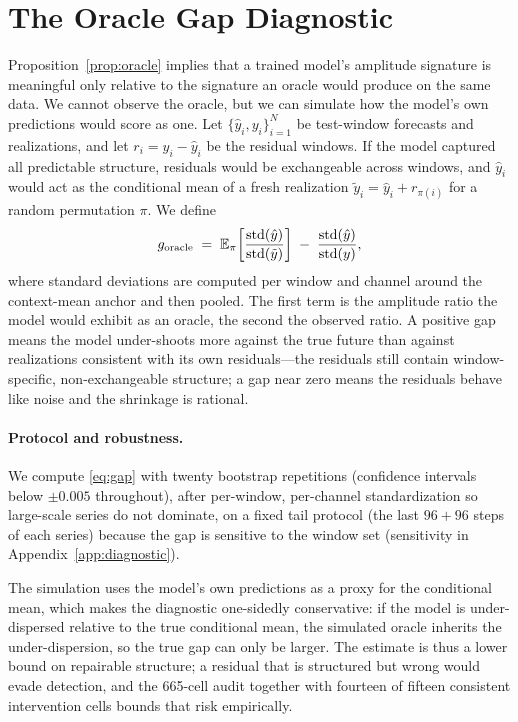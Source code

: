\section{The Oracle Gap Diagnostic}
\label{sec:diagnostic}

Proposition~\ref{prop:oracle} implies that a trained model's amplitude signature is meaningful only relative to the signature an oracle would produce on the same data. We cannot observe the oracle, but we can simulate how the model's own predictions would score as one. Let $\{\hat{y}_i, y_i\}_{i=1}^{N}$ be test-window forecasts and realizations, and let $r_i = y_i - \hat{y}_i$ be the residual windows. If the model captured all predictable structure, residuals would be exchangeable across windows, and $\hat{y}_i$ would act as the conditional mean of a fresh realization $\tilde{y}_i = \hat{y}_i + r_{\pi(i)}$ for a random permutation $\pi$. We define
\begin{equation}
    g_{\mathrm{oracle}} \;=\; \mathbb{E}_{\pi}\!\left[\frac{\mathrm{std}(\hat{y})}{\mathrm{std}(\tilde{y})}\right] \;-\; \frac{\mathrm{std}(\hat{y})}{\mathrm{std}(y)},
    \label{eq:gap}
\end{equation}
where standard deviations are computed per window and channel around the context-mean anchor and then pooled. The first term is the amplitude ratio the model would exhibit as an oracle, the second the observed ratio. A positive gap means the model under-shoots more against the true future than against realizations consistent with its own residuals---the residuals still contain window-specific, non-exchangeable structure; a gap near zero means the residuals behave like noise and the shrinkage is rational.

\paragraph{Protocol and robustness.}
We compute \eqref{eq:gap} with twenty bootstrap repetitions (confidence intervals below $\pm 0.005$ throughout), after per-window, per-channel standardization so large-scale series do not dominate, on a fixed tail protocol (the last $96{+}96$ steps of each series) because the gap is sensitive to the window set (sensitivity in Appendix~\ref{app:diagnostic}).

The simulation uses the model's own predictions as a proxy for the conditional mean, which makes the diagnostic one-sidedly conservative: if the model is under-dispersed relative to the true conditional mean, the simulated oracle inherits the under-dispersion, so the true gap can only be larger. The estimate is thus a lower bound on repairable structure; a residual that is structured but wrong would evade detection, and the 665-cell audit together with fourteen of fifteen consistent intervention cells bounds that risk empirically.

